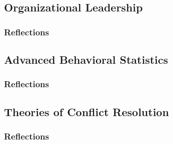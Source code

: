 \documentclass[12pt,titlepage]{article}
\begin{document}
\subsection{Organizational Leadership}
\subsubsection{Reflections}


\restoregeometry



\restoregeometry


\subsection{Advanced Behavioral Statistics}
\subsubsection{Reflections}

\subsection{Theories of Conflict Resolution}
\subsubsection{Reflections}


\restoregeometry



\end{document}

